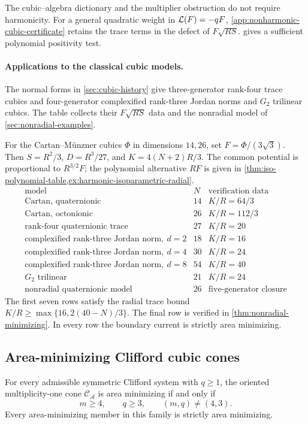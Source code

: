 The cubic--algebra dictionary and the multiplier obstruction do not
require harmonicity. For a general quadratic weight in
\(\mathcal L(F)=-qF\), \cref{app:nonharmonic-cubic-certificate} retains
the trace terms in the defect of \(F\sqrt{RS}\).
 gives a sufficient
polynomial positivity test.

\paragraph{Applications to the classical cubic models.}
The normal forms in \cref{sec:cubic-history} give three-generator
rank-four trace cubics and four-generator complexified rank-three Jordan
norms and \(G_2\) trilinear cubics. The table collects their
\(F\sqrt{RS}\) data and the nonradial model of
\cref{sec:nonradial-examples}.

For the Cartan--M\"unzner cubics \(\Phi\) in dimensions \(14,26\),
set \(F=\Phi/(3\sqrt3)\). Then \(S=R^2/3\), \(D=R^3/27\),
and \(K=4(N+2)R/3\). The common potential is proportional to
\(R^{3/2}F\); the polynomial alternative \(RF\) is given in
\cref{thm:iso-polynomial-table,ex:harmonic-isoparametric-radial}.
\[
\begin{array}{l|r|c}
\text{model}&N&\text{verification data}\\ \hline
\text{Cartan, quaternionic}&14&K/R=64/3\\
\text{Cartan, octonionic}&26&K/R=112/3\\
\text{rank-four quaternionic trace}&27&K/R=20\\
\text{complexified rank-three Jordan norm},\ d=2&18&K/R=16\\
\text{complexified rank-three Jordan norm},\ d=4&30&K/R=24\\
\text{complexified rank-three Jordan norm},\ d=8&54&K/R=40\\
G_2\text{ trilinear}&21&K/R=24\\
\text{nonradial quaternionic model}&26&\text{five-generator closure}
\end{array}
\]
The first seven rows satisfy the radial trace bound
\(K/R\geq\max\{16,2(40-N)/3\}\).
The final row is verified in \cref{thm:nonradial-minimizing}.
In every row the boundary current is strictly area minimizing.





\subsection{Area-minimizing Clifford cubic cones}
\label{sec:Clifford-classification}
\begin{theorem}
\label{thm:clifford-classification}
For every admissible symmetric Clifford system with \(q\geq1\), the
oriented multiplicity-one cone \(\mathcal C_{\mathcal A}\) is area
minimizing if and only if
\begin{equation}\label{eq:clifford-classification-list}
 \boxed{m\geq4,\qquad q\geq3,\qquad(m,q)\neq(4,3).}
\end{equation}
Every area-minimizing member in this family is strictly area minimizing.
\end{theorem}

